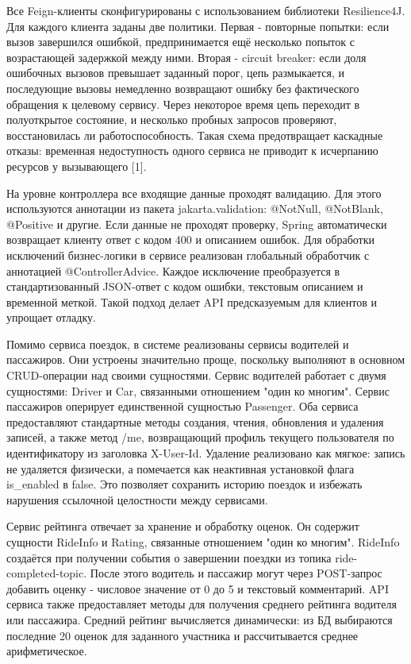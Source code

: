 {  \par \redline Все Feign-клиенты сконфигурированы с использованием библиотеки Resilience4J. Для каждого клиента заданы две политики. Первая - повторные попытки: если вызов завершился ошибкой, предпринимается ещё несколько попыток с возрастающей задержкой между ними. Вторая - circuit breaker: если доля ошибочных вызовов превышает заданный порог, цепь размыкается, и последующие вызовы немедленно возвращают ошибку без фактического обращения к целевому сервису. Через некоторое время цепь переходит в полуоткрытое состояние, и несколько пробных запросов проверяют, восстановилась ли работоспособность. Такая схема предотвращает каскадные отказы: временная недоступность одного сервиса не приводит к исчерпанию ресурсов у вызывающего [1].

  \par \redline На уровне контроллера все входящие данные проходят валидацию. Для этого используются аннотации из пакета jakarta.validation: @NotNull, @NotBlank, @Positive и другие. Если данные не проходят проверку, Spring автоматически возвращает клиенту ответ с кодом 400 и описанием ошибок. Для обработки исключений бизнес-логики в сервисе реализован глобальный обработчик с аннотацией @ControllerAdvice. Каждое исключение преобразуется в стандартизованный JSON-ответ с кодом ошибки, текстовым описанием и временной меткой. Такой подход делает API предсказуемым для клиентов и упрощает отладку.

  \par \redline Помимо сервиса поездок, в системе реализованы сервисы водителей и пассажиров. Они устроены значительно проще, поскольку выполняют в основном CRUD-операции над своими сущностями. Сервис водителей работает с двумя сущностями: Driver и Car, связанными отношением "один ко многим"{}. Сервис пассажиров оперирует единственной сущностью Passenger. Оба сервиса предоставляют стандартные методы создания, чтения, обновления и удаления записей, а также метод /me, возвращающий профиль текущего пользователя по идентификатору из заголовка X-User-Id. Удаление реализовано как мягкое: запись не удаляется физически, а помечается как неактивная установкой флага is\_enabled в false. Это позволяет сохранить историю поездок и избежать нарушения ссылочной целостности между сервисами.

  \par \redline Сервис рейтинга отвечает за хранение и обработку оценок. Он содержит сущности RideInfo и Rating, связанные отношением "один ко многим"{}. RideInfo создаётся при получении события о завершении поездки из топика ride-completed-topic. После этого водитель и пассажир могут через POST-запрос добавить оценку - числовое значение от 0 до 5 и текстовый комментарий. API сервиса также предоставляет методы для получения среднего рейтинга водителя или пассажира. Средний рейтинг вычисляется динамически: из БД выбираются последние 20 оценок для заданного участника и рассчитывается среднее арифметическое.

  \par
}

